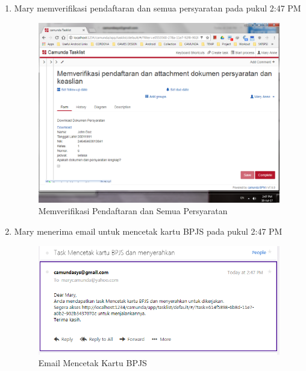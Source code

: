 \begin{enumerate}
	\item Mary memverifikasi pendaftaran dan semua persyaratan pada pukul 2:47 PM
			\begin{figure}[H]
			\centering
			\includegraphics[scale=0.5]{Gambar/Bab-5/kasus2/13}
			\caption{Memverifikasi Pendaftaran dan Semua Persyaratan} 
			\label{fig:pengujian_kasus2_13}
	\end{figure}
	

	\item Mary menerima email untuk mencetak kartu BPJS pada pukul 2:47 PM
			\begin{figure}[H]
			\centering
			\includegraphics[scale=0.8]{Gambar/Bab-5/kasus2/14}
			\caption{Email Mencetak Kartu BPJS} 
			\label{fig:pengujian_kasus2_14}
	\end{figure}
	


\end{enumerate}
